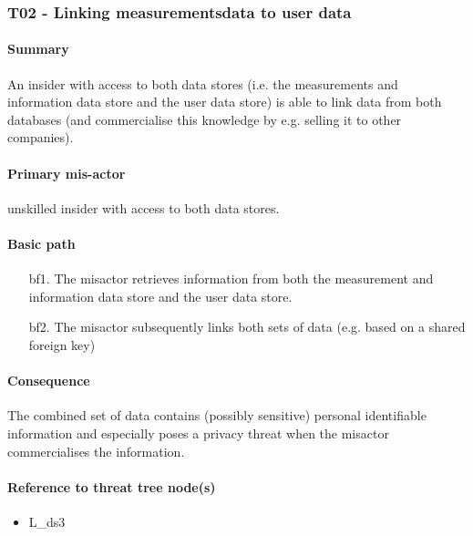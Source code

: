 \subsubsection{T02 - Linking measurementsdata to user data}
\label{threats:t02}
\paragraph{Summary}

\npar An insider with access to both data stores (i.e. the measurements and
information data store and the user data store) is able to link data from both
databases (and commercialise this knowledge by e.g. selling it to other
companies).

\paragraph{Primary mis-actor}

\npar unskilled insider with access to both data stores.

\paragraph{Basic path}

\begin{enumerate}
	\item[bf1.] The misactor retrieves information from both the measurement and
	information data store and the user data store.
    \item[bf2.] The misactor subsequently links both sets of data (e.g. based
    on a shared foreign key)
\end{enumerate}

\paragraph{Consequence}

\npar The combined set of data contains (possibly sensitive) personal
identifiable information and especially poses a privacy threat when the misactor
commercialises the information.

\paragraph{Reference to threat tree node(s)}

\begin{itemize}
  \item L\_ds3
\end{itemize}

